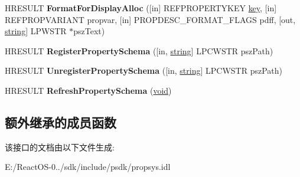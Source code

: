 \begin{DoxyCompactItemize}
\item 
\mbox{\label{interface_i_property_system_a815918344dc5809544064fd60e3adc0c}} 
H\+R\+E\+S\+U\+LT {\bfseries Format\+For\+Display\+Alloc} (\mbox{[}in\mbox{]} R\+E\+F\+P\+R\+O\+P\+E\+R\+T\+Y\+K\+EY \hyperlink{structkey}{key}, \mbox{[}in\mbox{]} R\+E\+F\+P\+R\+O\+P\+V\+A\+R\+I\+A\+NT propvar, \mbox{[}in\mbox{]} P\+R\+O\+P\+D\+E\+S\+C\+\_\+\+F\+O\+R\+M\+A\+T\+\_\+\+F\+L\+A\+GS pdff, \mbox{[}out, \hyperlink{structstring}{string}\mbox{]} L\+P\+W\+S\+TR $\ast$psz\+Text)
\item 
\mbox{\label{interface_i_property_system_a570120f123547cc8ac08bad95af8ddb2}} 
H\+R\+E\+S\+U\+LT {\bfseries Register\+Property\+Schema} (\mbox{[}in, \hyperlink{structstring}{string}\mbox{]} L\+P\+C\+W\+S\+TR psz\+Path)
\item 
\mbox{\label{interface_i_property_system_aa516fbbd601f7187479ade716458390a}} 
H\+R\+E\+S\+U\+LT {\bfseries Unregister\+Property\+Schema} (\mbox{[}in, \hyperlink{structstring}{string}\mbox{]} L\+P\+C\+W\+S\+TR psz\+Path)
\item 
\mbox{\label{interface_i_property_system_ad64fdbd2f9f76bb2ecf5479e91ea6c03}} 
H\+R\+E\+S\+U\+LT {\bfseries Refresh\+Property\+Schema} (\hyperlink{interfacevoid}{void})
\end{DoxyCompactItemize}
\subsection*{额外继承的成员函数}


该接口的文档由以下文件生成\+:\begin{DoxyCompactItemize}
\item 
E\+:/\+React\+O\+S-\/0../sdk/include/psdk/propsys.\+idl\end{DoxyCompactItemize}
